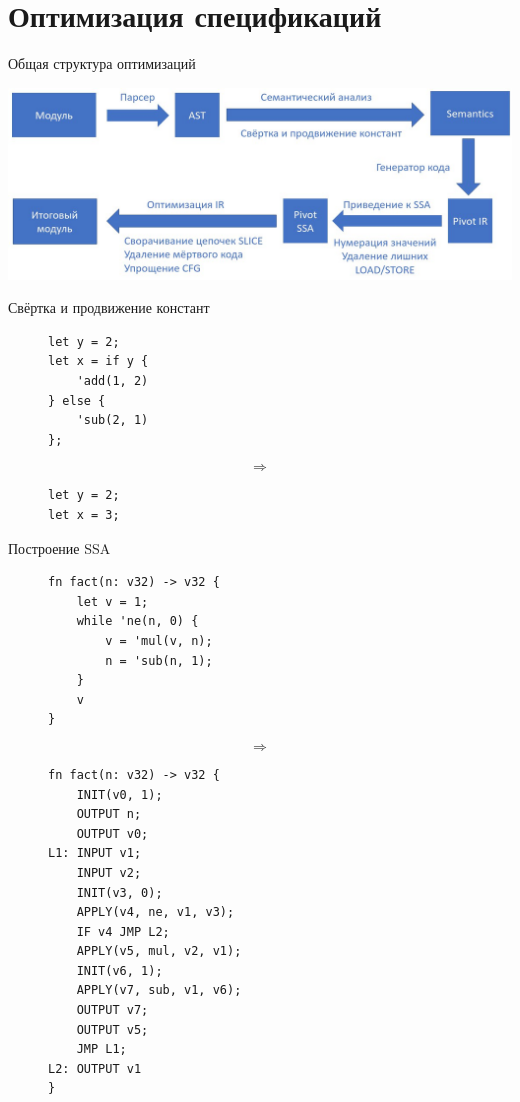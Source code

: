 \documentclass[presentation]{beamer}
\begin{document}
\section{Оптимизация спецификаций}
\label{sec:org22427e6}
\begin{frame}[label={sec:org32e937e}]{Общая структура оптимизаций}
\begin{center}
\includegraphics[width=.9\linewidth]{./compiler.jpg}
\end{center}
\end{frame}
\begin{frame}[label={sec:orgc590b15},fragile]{Свёртка и продвижение констант}
 \begin{figure}
\begin{minipage}[t]{0.4\textwidth}
\begin{verbatim}
let y = 2;
let x = if y {
    'add(1, 2)
} else {
    'sub(2, 1)
};
\end{verbatim}
\end{minipage}%
\begin{minipage}[t]{0.2\textwidth}
$$\Longrightarrow$$
\end{minipage}%
\begin{minipage}[t]{0.4\textwidth}
\begin{verbatim}
let y = 2;
let x = 3;   
\end{verbatim}
\end{minipage}%
\end{figure}
\end{frame}
\begin{frame}[label={sec:org39c47eb},fragile]{Построение SSA}
 \begin{figure}
\begin{minipage}[t]{0.4\textwidth}
\begin{verbatim}
fn fact(n: v32) -> v32 {
    let v = 1;
    while 'ne(n, 0) {
        v = 'mul(v, n);
        n = 'sub(n, 1);
    }
    v
}
\end{verbatim}
\end{minipage}%
\begin{minipage}[t]{0.2\textwidth}
$$\Longrightarrow$$
\end{minipage}%
\begin{minipage}[t]{0.4\textwidth}
\begin{verbatim}
fn fact(n: v32) -> v32 {
    INIT(v0, 1);
    OUTPUT n;
    OUTPUT v0;
L1: INPUT v1;
    INPUT v2;
    INIT(v3, 0);
    APPLY(v4, ne, v1, v3);
    IF v4 JMP L2;
    APPLY(v5, mul, v2, v1);
    INIT(v6, 1);
    APPLY(v7, sub, v1, v6);
    OUTPUT v7;
    OUTPUT v5;
    JMP L1;
L2: OUTPUT v1    
}
\end{verbatim}
\end{minipage}%
\end{figure}
\end{frame}
\end{document}
